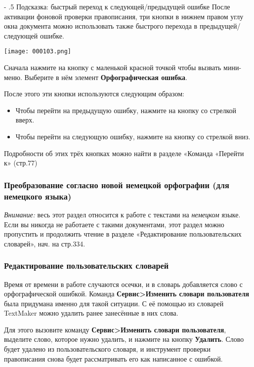 ﻿\documentclass[a4paper,10pt]{article}
\makeatletter
\renewcommand\paragraph{%
   \@startsection{paragraph}{4}{0mm}%
      {-\baselineskip}%
      {.5\baselineskip}%
      {\normalfont\normalsize\bfseries}}
\makeatother
\begin{document}
\paragraph{Подсказка: быстрый переход к следующей/предыдущей ошибке}
После активации фоновой проверки правописания, три кнопки в нижнем правом углу окна документа можно использовать также быстрого перехода в предыдущей/следующей ошибке.

\texttt{[image: 000103.png]}

Сначала нажмите на кнопку с маленькой красной точкой чтобы вызвать мини-меню. Выберите в нём элемент \textbf{Орфографическая ошибка}.

После этого эти кнопки используются следующим образом:

\begin{itemize}
 \item Чтобы перейти на предыдущую ошибку, нажмите на кнопку со стрелкой вверх.
 \item Чтобы перейти на следующую ошибку, нажмите на кнопку со стрелкой вниз.
\end{itemize}

Подробности об этих трёх кнопках можно найти в разделе «Команда «Перейти к» (стр.77)

\subsubsection{Преобразование согласно новой немецкой орфографии (для немецкого языка)}
\begin{mdframed}[backgroundcolor=blue!10]
\textit{Внимание:} весь этот раздел относится к работе с текстами на \textit{немецком} языке. Если вы никогда не работаете с такими документами, этот раздел можно пропустить и продолжить чтение в разделе «Редактирование пользовательских словарей», нач. на стр.334.
\end{mdframed}

\subsubsection{Редактирование пользовательских словарей}
Время от времени в работе случаются осечки, и в словарь добавляется слово с орфографической ошибкой. Команда \textbf{Сервис>Изменить словари пользователя} была придумана именно для такой ситуации. С её помощью из словарей TextMaker можно удалить ранее занесённые в них слова.

Для этого вызовите команду \textbf{Сервис>Изменить словари пользователя}, выделите слово, которое нужно удалить, и нажмите на кнопку \textbf{Удалить}. Слово будет удалено из пользовательского словаря, и инструмент проверки правописания снова будет рассматривать его как написанное с ошибкой.
\end{document}
